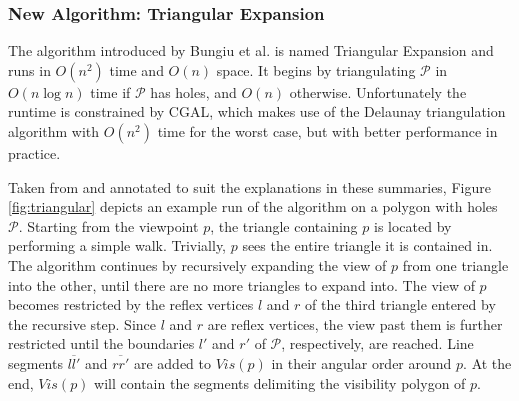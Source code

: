 \subsubsection{New Algorithm: Triangular Expansion}
The algorithm introduced by Bungiu et al. \cite{DBLP:journals/corr/BungiuHHHK14} is named Triangular Expansion and runs in $O(n^2)$ time and $O(n)$ space. It begins by triangulating $\mathcal P$ in $O(n \log n)$ time if $\mathcal P$ has holes, and $O(n)$ otherwise. Unfortunately the runtime is constrained by CGAL, which makes use of the Delaunay triangulation algorithm \cite{delaunay1934sphere} with $O(n^2)$ time for the worst case, but with better performance in practice. 

Taken from \cite{DBLP:journals/corr/BungiuHHHK14} and annotated to suit the explanations in these summaries, Figure \ref{fig:triangular} depicts an example run of the algorithm on a polygon with holes $\mathcal P$. Starting from the viewpoint $p$, the triangle containing $p$ is located by performing a simple walk. Trivially, $p$ sees the entire triangle it is contained in. The algorithm continues by recursively expanding the view of $p$ from one triangle into the other, until there are no more triangles to expand into. The view of $p$ becomes restricted by the reflex vertices $l$ and $r$ of the third triangle entered by the recursive step. Since $l$ and $r$ are reflex vertices, the view past them is further restricted until the boundaries $l'$ and $r'$ of $\mathcal P$, respectively,  are reached. Line segments $\overline{ll'}$ and $\overline{rr'}$ are added to $Vis(p)$ in their angular order around $p$. At the end, $Vis(p)$ will contain the segments delimiting the visibility polygon of $p$.

